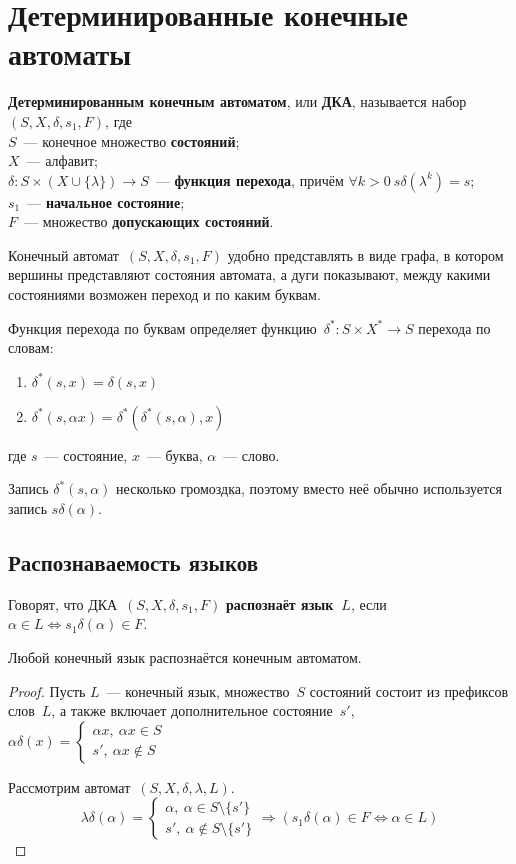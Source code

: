 \section{Детерминированные конечные автоматы}
  \textbf{Детерминированным конечным автоматом}, или \textbf{ДКА}, называется набор~$(S, X, \delta, s_1, F)$, где\\
$S$~--- конечное множество \textbf{состояний};\\
$X$~--- алфавит;\\
$\delta \colon S \times (X \cup \{ \lambda \}) \to S$~--- \textbf{функция перехода}, причём $\forall k > 0 \ s \delta(\lambda^k) = s$;\\
$s_1$~--- \textbf{начальное состояние};\\
$F$~--- множество \textbf{допускающих состояний}.

Конечный автомат~$(S, X, \delta, s_1, F)$ удобно представлять в виде графа, в котором вершины представляют состояния автомата, а дуги показывают, между какими состояниями возможен переход и по каким буквам.

Функция перехода по буквам определяет функцию~$\delta^* \colon S \times X^* \to S$ перехода по словам:
\begin{enumerate}
	\item $\delta^*(s, x) = \delta(s, x)$
	\item $\delta^*(s, \alpha x) = \delta^*(\delta^*(s, \alpha), x)$
\end{enumerate}
где $s$~--- состояние, $x$~--- буква, $\alpha$~--- слово.

Запись $\delta^*(s, \alpha)$ несколько громоздка, поэтому вместо неё обычно используется запись $s \delta(\alpha)$.

\subsection{Распознаваемость языков}
Говорят, что ДКА~$(S, X, \delta, s_1, F)$ \textbf{распознаёт язык~$L$}, если $\alpha \in L \Leftrightarrow s_1 \delta(\alpha) \in F$.

\begin{statement}
Любой конечный язык распознаётся конечным автоматом.
\end{statement}
\begin{proof}
Пусть $L$~--- конечный язык, множество~$S$ состояний состоит из префиксов слов~$L$, а также включает дополнительное состояние~$s'$, $\alpha \delta(x) =
\begin{cases}
\alpha x, \ \alpha x \in S \\
s', \ \alpha x \notin S
\end{cases}$

Рассмотрим автомат~$(S, X, \delta, \lambda, L)$.
\begin{equation*}
\lambda \delta(\alpha) =
\begin{cases}
\alpha, \ \alpha \in S \setminus \{ s' \} \\
s', \ \alpha \notin S \setminus \{ s' \}
\end{cases} \Rightarrow
(s_1 \delta(\alpha) \in F \Leftrightarrow \alpha \in L)
\end{equation*}
\end{proof}

